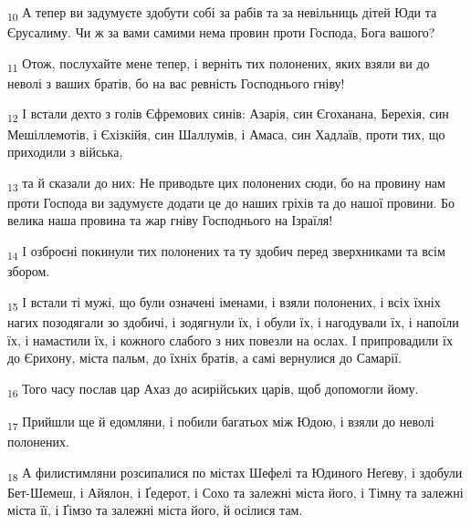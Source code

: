 \begin{tcolorbox}
\textsubscript{10} А тепер ви задумуєте здобути собі за рабів та за невільниць дітей Юди та Єрусалиму. Чи ж за вами самими нема провин проти Господа, Бога вашого?
\end{tcolorbox}
\begin{tcolorbox}
\textsubscript{11} Отож, послухайте мене тепер, і верніть тих полонених, яких взяли ви до неволі з ваших братів, бо на вас ревність Господнього гніву!
\end{tcolorbox}
\begin{tcolorbox}
\textsubscript{12} І встали дехто з голів Єфремових синів: Азарія, син Єгоханана, Берехія, син Мешіллемотів, і Єхізкійя, син Шаллумів, і Амаса, син Хадлаїв, проти тих, що приходили з війська,
\end{tcolorbox}
\begin{tcolorbox}
\textsubscript{13} та й сказали до них: Не приводьте цих полонених сюди, бо на провину нам проти Господа ви задумуєте додати це до наших гріхів та до нашої провини. Бо велика наша провина та жар гніву Господнього на Ізраїля!
\end{tcolorbox}
\begin{tcolorbox}
\textsubscript{14} І озброєні покинули тих полонених та ту здобич перед зверхниками та всім збором.
\end{tcolorbox}
\begin{tcolorbox}
\textsubscript{15} І встали ті мужі, що були означені іменами, і взяли полонених, і всіх їхніх нагих позодягали зо здобичі, і зодягнули їх, і обули їх, і нагодували їх, і напоїли їх, і намастили їх, і кожного слабого з них повезли на ослах. І припровадили їх до Єрихону, міста пальм, до їхніх братів, а самі вернулися до Самарії.
\end{tcolorbox}
\begin{tcolorbox}
\textsubscript{16} Того часу послав цар Ахаз до асирійських царів, щоб допомогли йому.
\end{tcolorbox}
\begin{tcolorbox}
\textsubscript{17} Прийшли ще й едомляни, і побили багатьох між Юдою, і взяли до неволі полонених.
\end{tcolorbox}
\begin{tcolorbox}
\textsubscript{18} А филистимляни розсипалися по містах Шефелі та Юдиного Неґеву, і здобули Бет-Шемеш, і Айялон, і Ґедерот, і Сохо та залежні міста його, і Тімну та залежні міста її, і Ґімзо та залежні міста його, й осілися там.
\end{tcolorbox}
